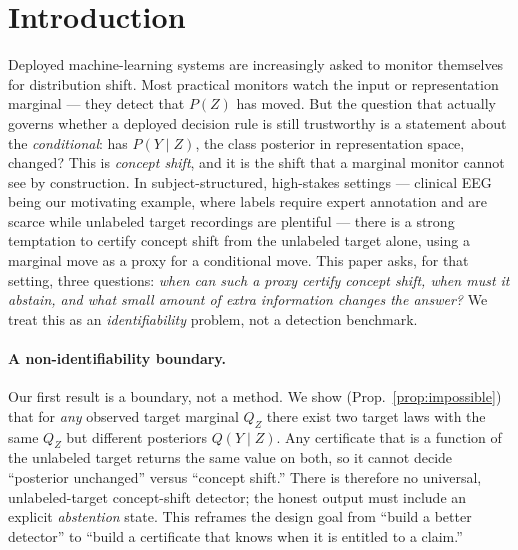 \section{Introduction}
\label{sec:intro}


Deployed machine-learning systems are increasingly asked to monitor themselves for distribution shift. Most
practical monitors watch the input or representation marginal --- they detect that $P(Z)$ has moved. But the
question that actually governs whether a deployed decision rule is still trustworthy is a statement about the
\emph{conditional}: has $P(Y\mid Z)$, the class posterior in representation space, changed? This is
\emph{concept shift}, and it is the shift that a marginal monitor cannot see by construction. In
subject-structured, high-stakes settings --- clinical EEG being our motivating example, where labels require
expert annotation and are scarce while unlabeled target recordings are plentiful --- there is a strong
temptation to certify concept shift from the unlabeled target alone, using a marginal move as a proxy for a
conditional move. This paper asks, for that setting, three questions: \emph{when can such a proxy certify
concept shift, when must it abstain, and what small amount of extra information changes the answer?} We treat this as
an \emph{identifiability} problem, not a detection benchmark. 

\paragraph{A non-identifiability boundary.}
Our first result is a boundary, not a method. We show (Prop.~\ref{prop:impossible}) that for \emph{any}
observed target marginal $Q_Z$ there exist two target laws with the same $Q_Z$ but different posteriors
$Q(Y\mid Z)$. Any certificate that is a function of the unlabeled target returns the same value on both, so
it cannot decide ``posterior unchanged'' versus ``concept shift.'' There is therefore no universal,
unlabeled-target concept-shift detector; the honest output must include an explicit \emph{abstention} state.
This reframes the design goal from ``build a better detector'' to ``build a certificate that knows when it is
entitled to a claim.'' 

